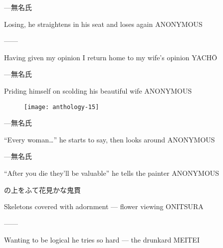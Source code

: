 \begin{haiku}
    {---}\hfill{\FH 無名氏}

    \vin{} Losing,
    \vin{} \vin{} he straightens in his seat
    \vin{} \vin{} \vin{} and loses again \hspace{\fill} ANONYMOUS
\end{haiku}

\begin{haiku}
    ---\hfill{---}

    \vin{} Having given my opinion
    \vin{} \vin{} I return home to
    \vin{} \vin{} \vin{} my wife's opinion \hspace{\fill} YACH\={O}
\end{haiku}

\begin{haiku}
    {---}\hfill{\FH 無名氏}

    \vin{} Priding himself
    \vin{} \vin{} on scolding
    \vin{} \vin{} \vin{} his beautiful wife \hspace{\fill} ANONYMOUS
\end{haiku}

\begin{figure}
    \texttt{[image: anthology-15]}
\end{figure}

\begin{haiku}
    {---}\hfill{\FH 無名氏}

    \vin{} ``Every woman\ldots''
    \vin{} \vin{} he starts to say,
    \vin{} \vin{} \vin{} then looks around \hspace{\fill} ANONYMOUS
\end{haiku}

\begin{haiku}
    {---}\hfill{\FH 無名氏}

    \vin{} ``After you die
    \vin{} \vin{} they'll be valuable''
    \vin{} \vin{} \vin{} he tells the painter \hspace{\fill} ANONYMOUS
\end{haiku}

\begin{haiku}
    {\FH {}の上をふて花見かな}\hfill{\FH 鬼貫}

    \vin{} Skeletons
    \vin{} \vin{} covered with adornment ---
    \vin{} \vin{} \vin{} flower viewing \hspace{\fill} ONITSURA
\end{haiku}

\begin{haiku}
    ---\hfill{---}

    \vin{} Wanting to be logical
    \vin{} \vin{} he tries so hard ---
    \vin{} \vin{} \vin{} the drunkard \hspace{\fill} MEITEI
\end{haiku}

